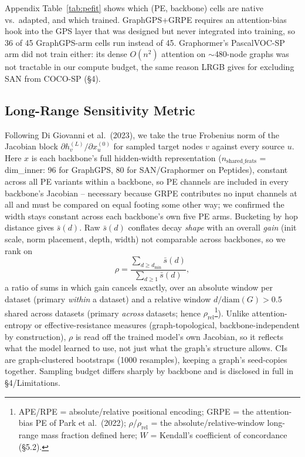 \documentclass[10pt]{article}
\begin{document}
Appendix Table~\ref{tab:pefit} shows which (PE, backbone) cells are native vs.\ adapted, and which trained. GraphGPS+GRPE requires an attention-bias hook into the GPS layer that was designed but never integrated into training, so 36 of 45 GraphGPS-arm cells run instead of 45. Graphormer's PascalVOC-SP arm did not train either: its dense $O(n^2)$ attention on $\sim$480-node graphs was not tractable in our compute budget, the same reason LRGB gives for excluding SAN from COCO-SP (\S4).

\subsection{Long-Range Sensitivity Metric}
Following Di Giovanni et al.\ (2023), we take the true Frobenius norm of the Jacobian block $\partial h_v^{(L)}/\partial x_u^{(0)}$ for sampled target nodes $v$ against every source $u$. Here $x$ is each backbone's full hidden-width representation ($n_{\text{shared\_feats}}$ = dim\_inner: 96 for GraphGPS, 80 for SAN/Graphormer on Peptides), constant across all PE variants within a backbone, so PE channels are included in every backbone's Jacobian -- necessary because GRPE contributes no input channels at all and must be compared on equal footing some other way; we confirmed the width stays constant across each backbone's own five PE arms. Bucketing by hop distance gives $\bar s(d)$. Raw $\bar s(d)$ conflates decay \emph{shape} with an overall \emph{gain} (init scale, norm placement, depth, width) not comparable across backbones, so we rank on
\[
\rho = \frac{\sum_{d \ge d_{\min}} \bar s(d)}{\sum_{d \ge 1} \bar s(d)},
\]
a ratio of sums in which gain cancels exactly, over an absolute window per dataset (primary \emph{within} a dataset) and a relative window $d/\mathrm{diam}(G) > 0.5$ shared across datasets (primary \emph{across} datasets; hence $\rho_{\text{rel}}$\footnote{APE/RPE = absolute/relative positional encoding; GRPE = the attention-bias PE of Park et al.\ (2022); $\rho$/$\rho_{\text{rel}}$ = the absolute/relative-window long-range mass fraction defined here; $W$ = Kendall's coefficient of concordance (\S5.2).}). Unlike attention-entropy or effective-resistance measures (graph-topological, backbone-independent by construction), $\rho$ is read off the trained model's own Jacobian, so it reflects what the model learned to use, not just what the graph's structure allows. CIs are graph-clustered bootstraps (1000 resamples), keeping a graph's seed-copies together. Sampling budget differs sharply by backbone and is disclosed in full in \S4/Limitations.
\end{document}
